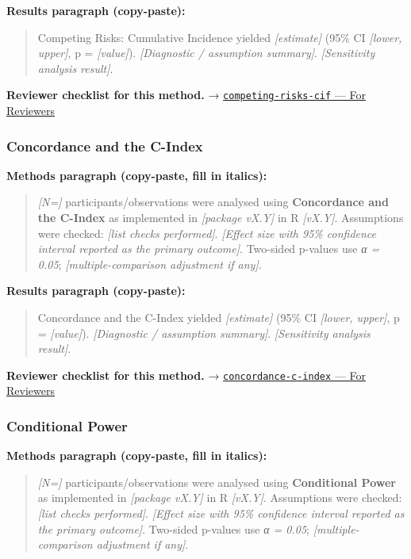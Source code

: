 \documentclass[
]{article}
\begin{document}
\textbf{Results paragraph (copy-paste):}

\begin{quote}
Competing Risks: Cumulative Incidence yielded \emph{{[}estimate{]}}
(95\% CI \emph{{[}lower, upper{]}}, p = \emph{{[}value{]}}).
\emph{{[}Diagnostic / assumption summary{]}}. \emph{{[}Sensitivity
analysis result{]}}.
\end{quote}

\textbf{Reviewer checklist for this method.} →
\href{../chapters/11-survival/competing-risks-cif.Rmd\#for-reviewers}{\texttt{competing-risks-cif}
--- For Reviewers}

\subsubsection{Concordance and the
C-Index}\label{concordance-and-the-c-index}

\textbf{Methods paragraph (copy-paste, fill in italics):}

\begin{quote}
\emph{{[}N={]}} participants/observations were analysed using
\textbf{Concordance and the C-Index} as implemented in \emph{{[}package
vX.Y{]}} in R \emph{{[}vX.Y{]}}. Assumptions were checked: \emph{{[}list
checks performed{]}}. \emph{{[}Effect size with 95\% confidence interval
reported as the primary outcome{]}}. Two-sided p-values use \emph{α =
0.05}; \emph{{[}multiple-comparison adjustment if any{]}}.
\end{quote}

\textbf{Results paragraph (copy-paste):}

\begin{quote}
Concordance and the C-Index yielded \emph{{[}estimate{]}} (95\% CI
\emph{{[}lower, upper{]}}, p = \emph{{[}value{]}}). \emph{{[}Diagnostic
/ assumption summary{]}}. \emph{{[}Sensitivity analysis result{]}}.
\end{quote}

\textbf{Reviewer checklist for this method.} →
\href{../chapters/11-survival/concordance-c-index.Rmd\#for-reviewers}{\texttt{concordance-c-index}
--- For Reviewers}

\subsubsection{Conditional Power}\label{conditional-power}

\textbf{Methods paragraph (copy-paste, fill in italics):}

\begin{quote}
\emph{{[}N={]}} participants/observations were analysed using
\textbf{Conditional Power} as implemented in \emph{{[}package vX.Y{]}}
in R \emph{{[}vX.Y{]}}. Assumptions were checked: \emph{{[}list checks
performed{]}}. \emph{{[}Effect size with 95\% confidence interval
reported as the primary outcome{]}}. Two-sided p-values use \emph{α =
0.05}; \emph{{[}multiple-comparison adjustment if any{]}}.
\end{quote}
\end{document}
